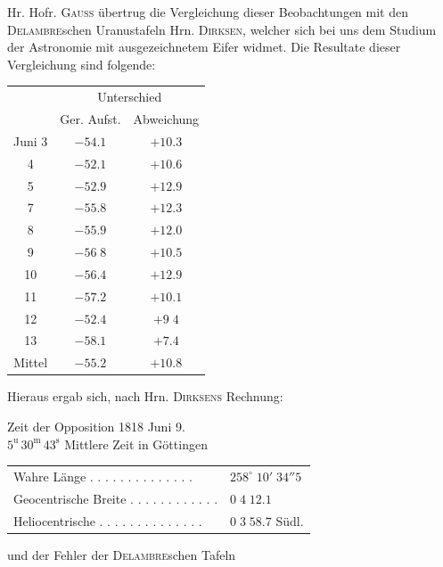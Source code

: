 \par\indent Hr. Hofr. \textsc{Gauss} übertrug die Vergleichung dieser Beobachtungen mit den \textsc{Delambre}schen Uranustafeln Hrn. \textsc{Dirksen}, welcher sich bei uns dem Studium der Astronomie mit ausgezeichnetem Eifer widmet. Die Resultate dieser Vergleichung sind folgende:

\begin{center}
\begin{tabular}{c|cc}
& \multicolumn{2}{c}{Unterschied} \\
& Ger. Aufst. & Abweichung \\
\hline
Juni 3 & $-54.1$ & $+10.3$ \\
4 & $-52.1$ & $+10.6$ \\
5 & $-52.9$ & $+12.9$ \\
7 & $-55.8$ & $+12.3$ \\
8 & $-55.9$ & $+12.0$ \\
9 & $-56\;8$ & $+10.5$ \\
10 & $-56.4$ & $+12.9$ \\
11 & $-57.2$ & $+10.1$ \\
12 & $-52.4$ & $+9\;4$ \\ 
13 & $-58.1$ & $+7.4$ \\
\hline
Mittel & $-55.2$ & $+10.8$ \\
\end{tabular}
\end{center}

\par\indent Hieraus ergab sich, nach Hrn. \textsc{Dirksens} Rechnung:

\begin{center}
Zeit der Opposition 1818 Juni 9.\\
$5^{\mathrm u}\,30^{\mathrm m}\,43^{\mathrm s}$ Mittlere Zeit in Göttingen
\end{center}
\begin{center}
\begin{tabular}{ll}
Wahre Länge . . . . . . . . . . . . . . & $258^\circ\;10'\;34''5$ \\
Geocentrische Breite . . . . . . . . . . . . & $0\;4\;12.1$ \\
Heliocentrische . . . . . . . . . . . . . . & $0\;3\;58.7$ Südl. \\
\end{tabular}
\end{center}

\noindent und der Fehler der \textsc{Delambre}schen Tafeln

